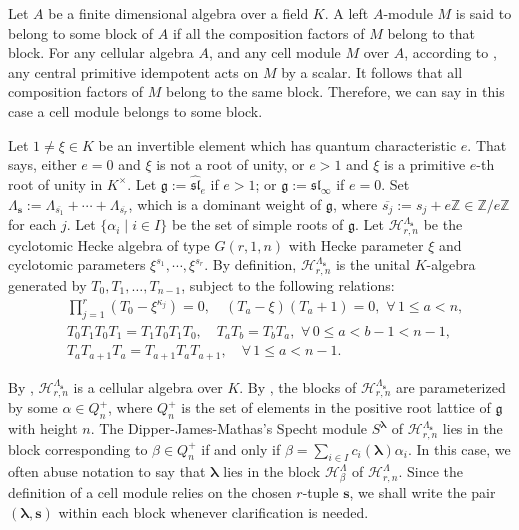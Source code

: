 \documentclass[a4paper,10pt]{amsart}
\theoremstyle{plain}
\renewcommand{\H}{\mathcal{H}}
\def\bs{{\boldsymbol{s}}}
\def\Z{{\mathbb Z}}
\def\Lam{\Lambda}
\def\blam{{\boldsymbol \lambda}}
\theoremstyle{plain}
\numberwithin{equation}{section}
\begin{document}
Let $A$ be a finite dimensional algebra over a field $K$. A left $A$-module $M$ is said to belong to some block of $A$ if all the composition factors of $M$ belong to that block. For any cellular algebra $A$,
and any cell module $M$ over $A$, according to \cite[(C3),(C3)']{GL}, any central primitive idempotent acts on $M$ by a scalar. It follows that all composition factors of $M$ belong to the same block.
Therefore, we can say in this case a cell module belongs to some block.

Let $1\neq\xi\in K$ be an invertible element which has quantum characteristic $e$. That says, either $e=0$ and $\xi$ is not a root of unity, or $e>1$ and $\xi$ is a primitive $e$-th root of unity in $K^\times$.
Let $\mathfrak{g}:=\hat{\mathfrak{sl}}_e$ if $e>1$; or $\mathfrak{g}:={\mathfrak{sl}}_\infty$ if $e=0$.
Set $\Lam_{\bs}:=\Lam_{\overline{s_1}}+\cdots+\Lam_{\overline{s_r}}$, which is a dominant weight of $\mathfrak{g}$, where $\overline{s_j}:=s_j+e\Z\in\Z/e\Z$ for each $j$. Let $\{\alpha_i\mid i\in I\}$ be the set of simple roots of $\mathfrak{g}$. Let $\H_{r,n}^{\Lam_\bs}$ be the cyclotomic Hecke algebra of type $G(r,1,n)$ with Hecke parameter $\xi$ and cyclotomic parameters $\xi^{s_1},\cdots,\xi^{s_r}$. By definition, $\H_{r,n}^{\Lam_\bs}$ is the unital $K$-algebra generated by $T_0,T_1,\ldots,T_{n-1}$, subject to the following relations: $$\begin{aligned}
&  \prod_{j=1}^r(T_0-\xi^{\kappa_j})=0,\quad (T_a-\xi)(T_a+1)=0,\,\,\forall\, 1\leq a<n,\\
& T_0T_1T_0T_1=T_1T_0T_1T_0, \quad T_aT_b=T_bT_a,\,\,\forall\,0\leq a<b-1<n-1,\\
& T_aT_{a+1}T_a=T_{a+1}T_aT_{a+1},\quad\forall\,1\leq a<n-1 .\end{aligned} $$

By \cite{DJM}, $\H_{r,n}^{\Lam_\bs}$ is a cellular algebra over $K$. By \cite{LM}, the blocks of $\H_{r,n}^{\Lam_\bs}$ are parameterized by some $\alpha\in Q_n^+$, where $Q_n^+$ is the set of elements in the positive root lattice of $\mathfrak{g}$ with height $n$. The Dipper-James-Mathas's Specht module $S^\blam$ of $\H_{r,n}^{\Lam_\bs}$ lies in the block corresponding to $\beta\in Q_n^+$ if and only if $\beta=\sum_{i\in I}c_{i}(\blam)\alpha_i$. In this case, we often abuse notation to say that $\blam$ lies in the block $\mathcal {H}_{\beta}^{\Lambda}$ of $\H_{r,n}^\Lam$. Since the definition of a cell module relies on the chosen $r$-tuple \(\boldsymbol{s}\), we shall write the pair \((\boldsymbol{\lambda}, \boldsymbol{s})\) within each block whenever clarification is needed.
\end{document}
